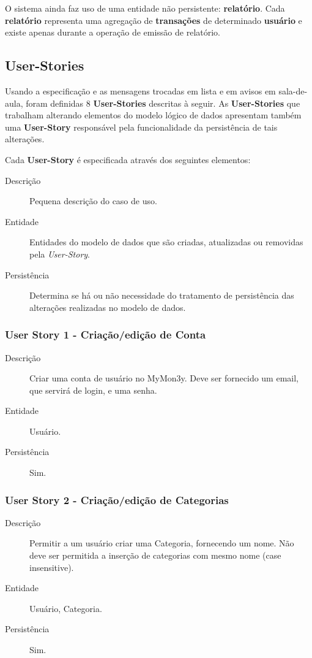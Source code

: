 \documentclass[12pt]{article}
\begin{document}
O sistema ainda faz uso de uma entidade não persistente: \textbf{relatório}. Cada \textbf{relatório} representa uma agregação de \textbf{transações} de determinado \textbf{usuário} e existe apenas durante a operação de emissão de relatório.

\subsection{User-Stories}
\label{us}

Usando a especificação e as mensagens trocadas em lista e em avisos em sala-de-aula, foram definidas 8 \textbf{User-Stories} descritas à seguir. As \textbf{User-Stories} que trabalham alterando elementos do modelo lógico de dados apresentam também uma \textbf{User-Story} responsável pela funcionalidade da persistência de tais alterações.

Cada \textbf{User-Story} é especificada através dos seguintes elementos:
\begin{description}
 \item [Descrição] Pequena descrição do caso de uso.
 \item [Entidade] Entidades do modelo de dados que são criadas, atualizadas ou removidas pela \textit{User-Story}.
 \item [Persistência] Determina se há ou não necessidade do tratamento de persistência das alterações realizadas no modelo de dados.
\end{description}

\subsubsection{User Story 1 - Criação/edição de Conta}

\begin{description}
 \item [Descrição] Criar uma conta de usuário no MyMon3y. Deve ser fornecido um email, que servirá de login, e uma senha.
 \item [Entidade] Usuário.
 \item [Persistência] Sim.
\end{description}

\subsubsection{User Story 2 - Criação/edição de Categorias}

\begin{description}
 \item [Descrição] Permitir a um usuário criar uma Categoria, fornecendo um nome. Não deve ser permitida a inserção de categorias com mesmo nome (case insensitive).
 \item [Entidade] Usuário, Categoria.
 \item [Persistência] Sim.
\end{description}
\end{document}
